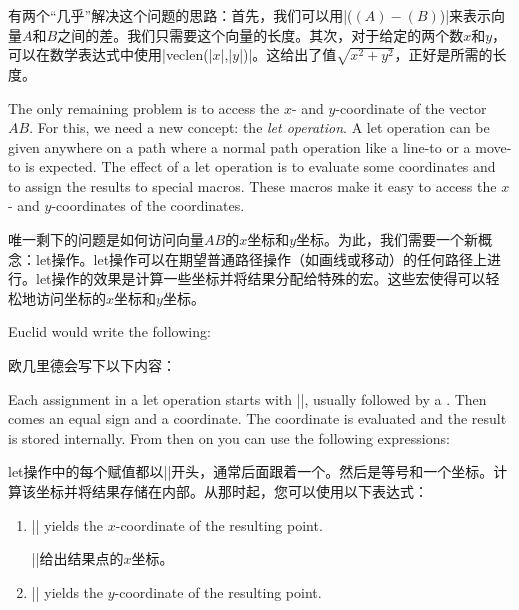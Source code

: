 \begin{paracol}{2}
有两个“几乎”解决这个问题的思路：首先，我们可以用|($ (A) - (B) $)|来表示向量$A$和$B$之间的差。我们只需要这个向量的长度。其次，对于给定的两个数$x$和$y$，可以在数学表达式中使用|veclen(|$x$|,|$y$|)|。这给出了值$\sqrt{x^2+y^2}$，正好是所需的长度。

The only remaining problem is to access the $x$- and $y$-coordinate of the
vector~$AB$. For this, we need a new concept: the \emph{let operation}. A let
operation can be given anywhere on a path where a normal path operation like a
line-to or a move-to is expected. The effect of a let operation is to evaluate
some coordinates and to assign the results to special macros. These macros make
it easy to access the $x$- and $y$-coordinates of the coordinates.

唯一剩下的问题是如何访问向量$AB$的$x$坐标和$y$坐标。为此，我们需要一个新概念：let操作。let操作可以在期望普通路径操作（如画线或移动）的任何路径上进行。let操作的效果是计算一些坐标并将结果分配给特殊的宏。这些宏使得可以轻松地访问坐标的$x$坐标和$y$坐标。


Euclid would write the following:

欧几里德会写下以下内容：

%
\begin{codeexample}[preamble={\usetikzlibrary{calc}}]
\end{codeexample}

Each assignment in a let operation starts with |\p|, usually followed by a
. Then comes an equal sign and a coordinate. The coordinate is
evaluated and the result is stored internally. From then on you can use the
following expressions:
%

let操作中的每个赋值都以|\p|开头，通常后面跟着一个。然后是等号和一个坐标。计算该坐标并将结果存储在内部。从那时起，您可以使用以下表达式：

\begin{enumerate}
    \item |\x| yields the $x$-coordinate of the resulting point.

    |\x|给出结果点的$x$坐标。
    \item |\y| yields the $y$-coordinate of the resulting point.


\end{enumerate}
\end{paracol}
